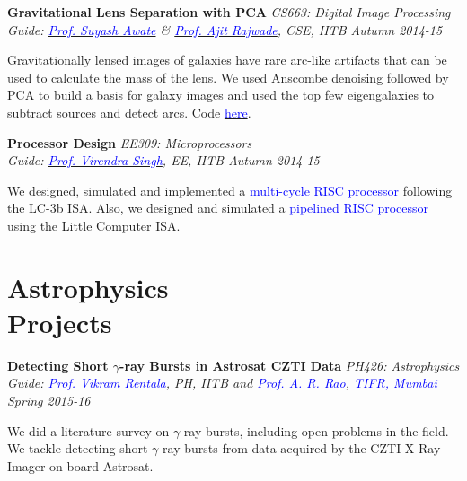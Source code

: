 \documentclass[margin,line]{res}
\newenvironment{list1}{
  \begin{list}{\ding{113}}{%
      \setlength{\itemsep}{0in}
      \setlength{\parsep}{0in} \setlength{\parskip}{0in}
      \setlength{\topsep}{0in} \setlength{\partopsep}{0in} 
      \setlength{\leftmargin}{0.17in}}}{\end{list}}
\begin{document}
\begin{resume}
\vspace*{-0.1in}

{\bf Gravitational Lens Separation with PCA} \hfill \textit{CS663: Digital Image Processing} \\
{\em Guide: \href{https://www.cse.iitb.ac.in/~suyash}{\textcolor{blue}{Prof. Suyash Awate}} \& \href{https://www.cse.iitb.ac.in/~ajitvr}{\textcolor{blue}{Prof. Ajit Rajwade}}, CSE, IITB \hfill Autumn 2014-15} \\
\vspace*{-.15in}
\begin{list1}
\item[] Gravitationally lensed images of galaxies have rare arc-like artifacts that can be used to calculate the mass of the lens. We used Anscombe denoising followed by PCA to build a basis for galaxy images and used the top few eigengalaxies to subtract sources and detect arcs. Code \href{https://github.com/alankarkotwal/pca-lens-finder}{\textcolor{blue} {here}}.
\end{list1}

\vspace*{-0.1in}

{\bf Processor Design} \hfill \textit{EE309: Microprocessors} \\
{\em Guide: \href{https://www.ee.iitb.ac.in/~viren/}{\textcolor{blue}{Prof. Virendra Singh}}, EE, IITB \hfill Autumn 2014-15} \\
\vspace*{-.15in}
\begin{list1}
\item[] We designed, simulated and implemented a \href{https://github.com/alankarkotwal/lc-3b-processor}{\textcolor{blue} {multi-cycle RISC processor}} following the LC-3b ISA. Also, we designed and simulated a \href{https://github.com/alankarkotwal/lca-processor}{\textcolor{blue} {pipelined RISC processor}} using the Little Computer ISA.
\end{list1}

\section{\sc Astrophysics \\Projects}
{\bf Detecting Short $\gamma$-ray Bursts in Astrosat CZTI Data} \hfill \textit{PH426: Astrophysics} \\
{\em Guide: \href{https://sites.google.com/site/vikramrentalahome/}{\textcolor{blue}{Prof. Vikram Rentala}}, \textit{PH, IITB} and \href{http://web.tifr.res.in/~arrao/}{\textcolor{blue}{Prof. A. R. Rao}}, \href{http://www.tifr.res.in/}{\textcolor{blue} {TIFR, Mumbai}} \hfill Spring 2015-16} \\
\vspace*{-.15in}
\begin{list1}
\item[] We did a literature survey on $\gamma$-ray bursts, including open problems in the field. We tackle detecting short $\gamma$-ray bursts from data acquired by the CZTI X-Ray Imager on-board Astrosat.
\end{list1}


\end{resume}
\end{document}
